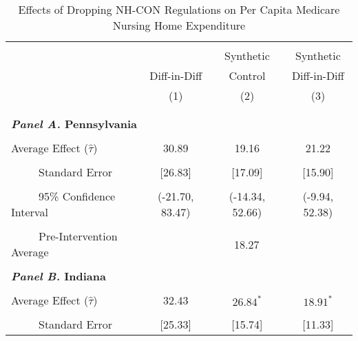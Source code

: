 \documentclass[12pt]{article}
\begin{document}
\null
\vfill
\begin{table}[htbp]\centering \footnotesize
\def\sym#1{\ifmmode^{#1}\else\(^{#1}\)\fi}
\captionsetup{width=.8\textwidth}
\caption{\centering Effects of Dropping NH-CON Regulations on Per Capita Medicare Nursing Home Expenditure}
\label{tab:ave_results_medicare_exp_nobord_nocon}
\setlength{\tabcolsep}{10pt}
\begin{tabular}{l*{3}{c}}
\hline\hline
\\[-2ex]
&\multicolumn{1}{c}{}&\multicolumn{1}{c}{Synthetic}&\multicolumn{1}{c}{Synthetic}\\
&\multicolumn{1}{c}{Diff-in-Diff}&\multicolumn{1}{c}{Control}&\multicolumn{1}{c}{Diff-in-Diff}\\
&\multicolumn{1}{c}{(1)}&\multicolumn{1}{c}{(2)}&\multicolumn{1}{c}{(3)}\\
\\[-2ex]
\hline
\\[-.1ex]
\multicolumn{4}{l}{\textbf{\textit{Panel A.} Pennsylvania}}\\
\\[-1.5ex]
\multicolumn{1}{l}{Average Effect ($\hat{\tau}$)}&   \multicolumn{1}{c}{30.89}&   \multicolumn{1}{c}{19.16} &  \multicolumn{1}{c}{21.22}\\
\\[-2ex]
\multicolumn{1}{l}{\ \ \ \ \ Standard Error}  &\multicolumn{1}{c}{[26.83]}&\multicolumn{1}{c}{[17.09]}&\multicolumn{1}{c}{[15.90]}\\
\\[-2ex]
\multicolumn{1}{l}{\ \ \ \ \ 95\% Confidence Interval}&   \multicolumn{1}{c}{(-21.70, 83.47)}&   \multicolumn{1}{c}{(-14.34, 52.66)}&   \multicolumn{1}{c}{(-9.94, 52.38)}\\
\\[-2ex]
\multicolumn{1}{l}{\ \ \ \ \ Pre-Intervention Average}&   \multicolumn{3}{c}{18.27}\\
\\[-.1ex]
\multicolumn{4}{l}{\textbf{\textit{Panel B.} Indiana}}\\
\\[-1.5ex]
\multicolumn{1}{l}{Average Effect ($\hat{\tau}$)}&   \multicolumn{1}{c}{32.43}&   \multicolumn{1}{c}{$26.84^{*}$}&  \multicolumn{1}{c}{$18.91^{*}$}\\
\\[-2ex]
\multicolumn{1}{l}{\ \ \ \ \ Standard Error}  &\multicolumn{1}{c}{[25.33]}&\multicolumn{1}{c}{[15.74]}&\multicolumn{1}{c}{[11.33]}\\

\end{tabular}
\end{table}
\end{document}

